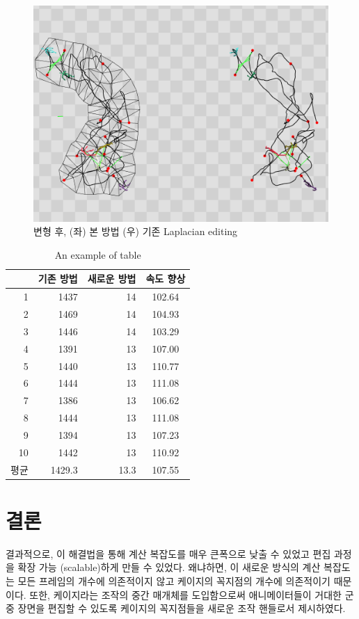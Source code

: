 \documentclass[12pt,a4paper,oneside,final]{report}
\begin{document}
\begin{figure}[p]
\centering
\includegraphics[width=0.9\linewidth]{after_deform_c.png}
\caption{변형 후, (좌) 본 방법 (우) 기존 Laplacian editing}
\label{fig:after_deform}
\end{figure}

\begin{table}[ht]
\centering
\begin{tabular}{r*{2}{r}c}
 & 기존 방법 & 새로운 방법 & 속도 향상 \\
\hline
1 & 1437 & 14 & 102.64 \\
2 & 1469 & 14 & 104.93 \\
3 & 1446 & 14 & 103.29 \\
4 & 1391 & 13 & 107.00 \\
5 & 1440 & 13 & 110.77 \\
6 & 1444 & 13 & 111.08 \\
7 & 1386 & 13 & 106.62 \\
8 & 1444 & 13 & 111.08 \\
9 & 1394 & 13 & 107.23 \\
10 & 1442 & 13 & 110.92 \\
\hline
평균 & 1429.3 & 13.3 & 107.55 \\
\end{tabular}
  \caption{An example of table}
  \label{my_table}
\end{table}

\chapter{결론}
결과적으로, 이 해결법을 통해 계산 복잡도를 매우 큰폭으로 낮출 수 있었고 편집
과정을 확장 가능 (scalable)하게 만들 수 있었다. 왜냐하면, 이 새로운 방식의 계산
복잡도는 모든 프레임의 개수에 의존적이지 않고 케이지의 꼭지점의 개수에
의존적이기 때문이다. 또한, 케이지라는 조작의 중간 매개체를 도입함으로써
애니메이터들이 거대한 군중 장면을 편집할 수 있도록 케이지의 꼭지점들을 새로운
조작 핸들로서 제시하였다.



\printbibliography
\end{document}

